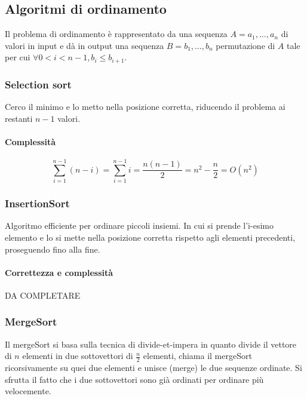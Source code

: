 \subsection{Algoritmi di ordinamento}
Il problema di ordinamento \`e rappresentato da una sequenza $A=a_1, \dots, a_n$ di valori in input e d\`a in output una sequenza $B=b_1, \dots, b_n$ 
permutazione di $A$ tale per cui $\forall 0<i<n-1, b_i\le b_{i+1}$.
\subsubsection{Selection sort}
Cerco il minimo e lo metto nella posizione corretta, riducendo il problema ai restanti $n-1$ valori.



\paragraph{Complessit\`a}
\begin{equation*}
\sum\limits_{i=1}^{n-1}(n-i)=\sum\limits_{i=1}^{n-1}i=\dfrac{n(n-1)}{2}=n^2-\dfrac{n}{2}=O(n^2)
\end{equation*}
\subsubsection{InsertionSort}
Algoritmo efficiente per ordinare piccoli insiemi. In cui si prende l'i-esimo elemento e lo si mette nella posizione corretta rispetto agli elementi
precedenti, proseguendo fino alla fine.

\paragraph{Correttezza e complessit\`a}
DA COMPLETARE
\subsubsection{MergeSort}
Il mergeSort si basa sulla tecnica di divide-et-impera in quanto divide il vettore di $n$ elementi in due sottovettori di $\frac{n}{2}$ elementi, chiama il
mergeSort ricorsivamente su quei due elementi e unisce (merge) le due sequenze ordinate. Si sfrutta il fatto che i due sottovettori sono gi\`a ordinati per
ordinare pi\`u velocemente.
